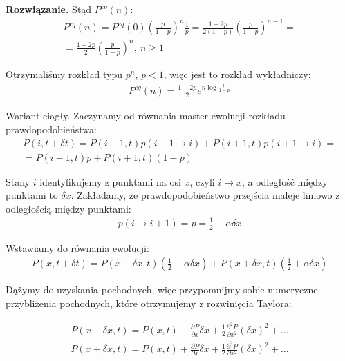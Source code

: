 \documentclass[11pt,a4paper]{article}
\newenvironment{solution}{\vspace{1cm} \par\textbf{Rozwiązanie.} \vspace{1cm}}{}
\begin{document}
\begin{solution}
Stąd $P^{eq}(n)$:
\begin{align*}
    P^{eq}(n) = P^{eq}(0) \left(\frac{p}{1-p}\right)^{n} \frac{1}{p} = 
    \frac{1-2p}{2(1-p)} \left(\frac{p}{1-p}\right)^{n-1} = \\
    = \frac{1-2p}{2} \left(\frac{p}{1-p}\right)^{n},~ n \geq 1
\end{align*}

Otrzymaliśmy rozkład typu $p^{n}$, $p<1$, więc jest to rozkład wykładniczy:
\begin{align*}
    P^{eq}(n) = \frac{1-2p}{2} e^{n \log \frac{p}{1-p}}
\end{align*}


\vspace{1cm}

Wariant ciągły. Zaczynamy od równania master ewolucji rozkładu prawdopodobieństwa:
\begin{align*}
    P(i, t + \delta t) =  P(i-1, t) p(i-1 \to i) + P(i+1, t) p(i+1 \to i) = \\
    = P(i-1, t) p + P(i+1, t) (1-p)
\end{align*}


Stany $i$ identyfikujemy z punktami na osi $x$, czyli $i \to x$, a odległość między 
punktami to $\delta x$. Zakładamy, że prawdopodobieństwo przejścia maleje liniowo z 
odległością między punktami: 
\begin{align*}
    p(i \to i+1) = p = \frac{1}{2} - \alpha \delta x 
\end{align*}

Wstawiamy do równania ewolucji:
\begin{align*}
    P(x, t + \delta t) =  P(x - \delta x, t) \left(\frac{1}{2} - \alpha \delta x\right) + P(x + \delta x, t) \left(\frac{1}{2} + \alpha \delta x\right)
\end{align*}

Dążymy do uzyskania pochodnych, więc przypomnijmy sobie numeryczne przybliżenia pochodnych, które
otrzymujemy z rozwinięcia Taylora:

\begin{align*}
    P(x - \delta x, t) = P(x, t) - \frac{\partial P}{\partial x} \delta x + \frac{1}{2} \frac{\partial^2 P}{\partial x^2} (\delta x)^2 + \ldots \\
    P(x + \delta x, t) = P(x, t) + \frac{\partial P}{\partial x} \delta x + \frac{1}{2} \frac{\partial^2 P}{\partial x^2} (\delta x)^2 + \ldots \\
\end{align*}


\end{solution}
\end{document}
